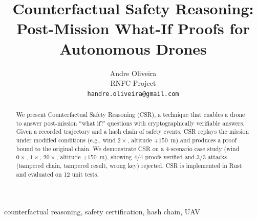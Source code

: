 ﻿\documentclass[conference]{IEEEtran}
\title{Counterfactual Safety Reasoning: Post-Mission What-If Proofs for Autonomous Drones}
\author{Andre Oliveira\\RNFC Project\\\texttt{handre.oliveira@gmail.com}}
\begin{document}
\maketitle

\begin{abstract}
We present Counterfactual Safety Reasoning (CSR), a technique that
enables a drone to answer post-mission ``what if?' questions with
cryptographically verifiable answers. Given a recorded trajectory and
a hash chain of safety events, CSR replays the mission under modified
conditions (e.g., wind $2\times$, altitude $+150$~m) and produces a
proof bound to the original chain. We demonstrate CSR on a 4-scenario
case study (wind $0\times$, $1\times$, $20\times$, altitude $+150$~m),
showing 4/4 proofs verified and 3/3 attacks (tampered chain, tampered
result, wrong key) rejected. CSR is implemented in Rust and evaluated
on 12 unit tests.
\end{abstract}

\begin{IEEEkeywords}
counterfactual reasoning, safety certification, hash chain, UAV
\end{IEEEkeywords}









\end{document}
